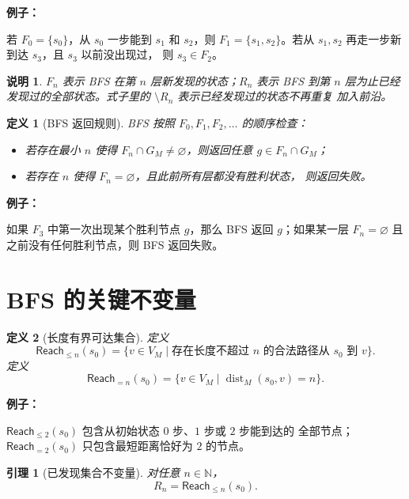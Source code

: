 \documentclass[UTF8]{ctexart}
\theoremstyle{nesylinkblock}
\newtheorem{definition}{定义}
\newtheorem{lemma}{引理}
\newtheorem{remark}{说明}
\DeclareMathOperator{\dist}{dist}
\newenvironment{examplebox}
  {\begin{center}\begin{lrbox}{\exampleboxcontent}\begin{minipage}{0.92\linewidth}
   \textbf{例子：}\par\smallskip}
  {\end{minipage}\end{lrbox}\fbox{\usebox{\exampleboxcontent}}\end{center}}
\begin{document}
\begin{examplebox}
若 $F_0=\{s_0\}$，从 $s_0$ 一步能到 $s_1$ 和 $s_2$，则
$F_1=\{s_1,s_2\}$。若从 $s_1,s_2$ 再走一步新到达 $s_3$，且 $s_3$ 以前没出现过，
则 $s_3\in F_2$。
\end{examplebox}

\begin{remark}
$F_n$ 表示 BFS 在第 $n$ 层新发现的状态；$R_n$ 表示 BFS 到第 $n$ 层为止已经
发现过的全部状态。式子里的 $\setminus R_n$ 表示已经发现过的状态不再重复
加入前沿。
\end{remark}

\begin{definition}[BFS 返回规则]
BFS 按照 $F_0,F_1,F_2,\ldots$ 的顺序检查：
\begin{itemize}[leftmargin=2em]
  \item 若存在最小 $n$ 使得 $F_n\cap G_M\ne\varnothing$，则返回任意
  $g\in F_n\cap G_M$；
  \item 若存在 $n$ 使得 $F_n=\varnothing$，且此前所有层都没有胜利状态，
  则返回失败。
\end{itemize}
\end{definition}

\begin{examplebox}
如果 $F_3$ 中第一次出现某个胜利节点 $g$，那么 BFS 返回 $g$；如果某一层
$F_n=\varnothing$ 且之前没有任何胜利节点，则 BFS 返回失败。
\end{examplebox}

\section{BFS 的关键不变量}

\begin{definition}[长度有界可达集合]
定义
\[
  \mathsf{Reach}_{\le n}(s_0)
  =
  \{v\in V_M\mid
  \text{存在长度不超过 }n\text{ 的合法路径从 }s_0\text{ 到 }v\}.
\]
定义
\[
  \mathsf{Reach}_{=n}(s_0)
  =
  \{v\in V_M\mid \dist_M(s_0,v)=n\}.
\]
\end{definition}

\begin{examplebox}
$\mathsf{Reach}_{\le2}(s_0)$ 包含从初始状态 $0$ 步、$1$ 步或 $2$ 步能到达的
全部节点；$\mathsf{Reach}_{=2}(s_0)$ 只包含最短距离恰好为 $2$ 的节点。
\end{examplebox}

\begin{lemma}[已发现集合不变量]
对任意 $n\in\mathbb{N}$，
\[
  R_n=\mathsf{Reach}_{\le n}(s_0).
\]
\end{lemma}
\end{document}
